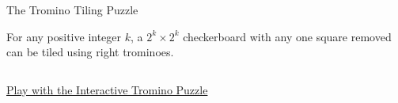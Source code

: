 \begin{frame}{}
  \centerline{\LARGE The Tromino Tiling Puzzle}
\end{frame}

\begin{frame}{}
  \begin{theorem}
    For any positive integer $k$, 
    a $2^k \times 2^k$ checkerboard with any one square removed 
    can be tiled using right trominoes.
  \end{theorem}

  \vspace{0.30cm}
  \begin{columns}
  \end{columns}

  \vspace{0.80cm}
  \centerline{{\Large {}} \href{http://www3.amherst.edu/~nstarr/puzzle.html}{Play with the Interactive Tromino Puzzle}}
\end{frame}

\begin{frame}{}
  \centerline{}
\end{frame}
